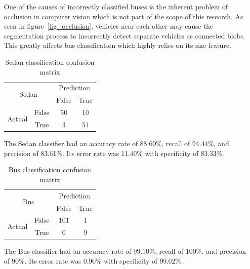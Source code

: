 \documentclass[conference]{IEEEtran}
\begin{document}
One of the causes of incorrectly classified buses is the inherent problem of occlusion in computer vision which is not part of the scope of this research. As seen in figure~\ref{fig_occlusion}, vehicles near each other may cause the segmentation process to incorrectly detect separate vehicles as connected blobs. This greatly affects bus classification which highly relies on its size feature.


\begin{table}[]
\centering
\caption{Sedan classification confusion matrix}
\label{cm:sedan}
\begin{tabular}{|c|c|c|c|}
\hline
\multicolumn{2}{|c|}{\multirow{2}{*}{Sedan}} & \multicolumn{2}{c|}{Prediction} \\ \cline{3-4} 
\multicolumn{2}{|c|}{}                       & False          & True           \\ \hline
\multirow{2}{*}{Actual}         & False      & 50             & 10             \\ \cline{2-4} 
                                & True       &  3             & 51             \\ \hline
\end{tabular}
\end{table}

The Sedan classifier had an accuracy rate of 88.60\%, recall of 94.44\%, and precision of 83.61\%. Its error rate was 11.40\% with specificity of 83.33\%. 

\begin{table}[]
\centering
\caption{Bus classification confusion matrix}
\label{cm:bus}
\begin{tabular}{|c|c|c|c|}
\hline
\multicolumn{2}{|c|}{\multirow{2}{*}{Bus}} & \multicolumn{2}{c|}{Prediction}  \\ \cline{3-4} 
\multicolumn{2}{|c|}{}                       & False          & True          \\ \hline
\multirow{2}{*}{Actual}         & False      & 101            & 1             \\ \cline{2-4} 
                                & True       & 0              & 9             \\ \hline
\end{tabular}
\end{table}

The Bus classifier had an accuracy rate of 99.10\%, recall of 100\%, and precision of 90\%. Its error rate was 0.90\% with specificity of 99.02\%. 
\end{document}
